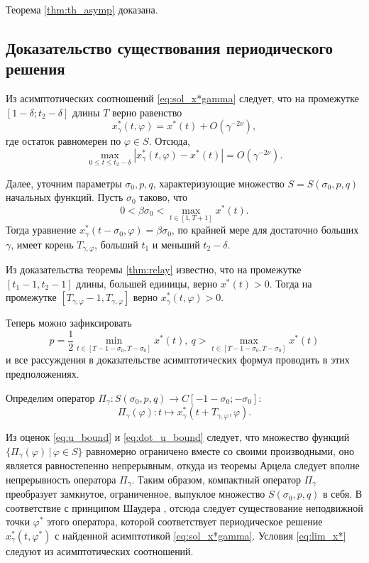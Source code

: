 Теорема \ref{thm:th_asymp} доказана.

\subsection{Доказательство существования периодического решения}

Из асимптотических соотношений \eqref{eq:sol_x*gamma} следует, что на промежутке $[1 - \delta; t_2 - \delta]$ длины $T$ верно равенство
\[
x_\gamma^*(t, \varphi) = x^*(t) + O(\gamma^{-2\nu}),
\]
где остаток равномерен по $\varphi \in S$.
Отсюда,
\[
\max\limits_{0 \leqslant t \leqslant t_2 - \delta}|x_\gamma^*(t, \varphi) - x^*(t)| = O(\gamma^{-2\nu}).
\]

Далее, уточним параметры $\sigma_0, p, q$, характеризующие множество $S = S(\sigma_0, p, q)$ начальных функций. Пусть $\sigma_0$ таково, что
%
\[
0 < \beta \sigma_0 < \max\limits_{t \in [1, T + 1]} x^*(t).
\]
%
Тогда уравнение $x^*_\gamma(t - \sigma_0, \varphi) = \beta \sigma_0$, по крайней мере для достаточно больших $\gamma$, имеет корень $T_{\gamma, \varphi}$, больший $t_1$ и меньший $t_2 - \delta$.

Из доказательства теоремы \ref{thm:relay} известно, что на промежутке $[t_1 - 1, t_2 - 1]$ длины, большей единицы, верно $x^*(t) > 0$. Тогда на промежутке $[T_{\gamma, \varphi} - 1, T_{\gamma, \varphi}]$ верно $x^*_{\gamma}(t, \varphi) > 0$.

Теперь можно зафиксировать
\[
p = \frac{1}{2}\min\limits_{t \in [T - 1 - \sigma_0, T - \sigma_0]} x^*(t), \ q > \max\limits_{t \in [T - 1 - \sigma_0, T - \sigma_0]} x^*(t)
\]
и все рассуждения в доказательстве асимптотических формул проводить в этих предположениях.

Определим оператор $\Pi_{\gamma}: S(\sigma_0, p, q) \to C[-1-\sigma_0; -\sigma_0]$:
\begin{equation}
	\Pi_{\gamma}(\varphi): t \mapsto x^*_{\gamma}(t + T_{\gamma, \varphi}, \varphi).
\end{equation}

Из оценок \eqref{eq:u_bound} и \eqref{eq:dot_u_bound} следует, что множество функций $\{\Pi_{\gamma}(\varphi)\, | \, \varphi \in S\}$ равномерно ограничено вместе со своими производными, оно является равностепенно непрерывным, откуда из теоремы Арцела следует вполне непрерывность оператора $\Pi_{\gamma}$. Таким образом, компактный оператор $\Pi_{\gamma}$ преобразует замкнутое, ограниченное, выпуклое множество $S(\sigma_0, p, q)$ в себя. В соответствие с принципом Шаудера \cite{Krasnov1975}, отсюда следует существование неподвижной точки $\varphi^*$ этого оператора, которой соответствует периодическое решение $x^*_\gamma(t, \varphi^*)$ с найденной асимптотикой \eqref{eq:sol_x*gamma}. Условия \eqref{eq:lim_x*} следуют из асимптотических соотношений.

